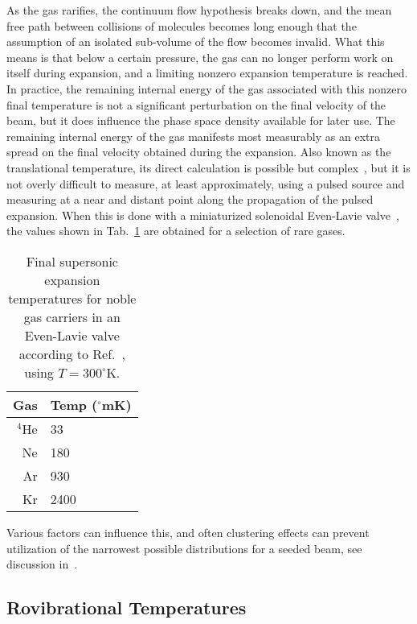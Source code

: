 As the gas rarifies, the continuum flow hypothesis breaks down, and the mean free path between collisions of molecules becomes long enough that the assumption of an isolated sub-volume of the flow becomes invalid.
What this means is that below a certain pressure, the gas can no longer perform work on itself during expansion, and a limiting nonzero expansion temperature is reached.
In practice, the remaining internal energy of the gas associated with this nonzero final temperature is not a significant perturbation on the final velocity of the beam, but it does influence the phase space density available for later use.
The remaining internal energy of the gas manifests most measurably as an extra spread on the final velocity obtained during the expansion.
Also known as the translational temperature, its direct calculation is possible but complex~\cite{Montero2017}, but it is not overly difficult to measure, at least approximately, using a pulsed source and measuring at a near and distant point along the propagation of the pulsed expansion.
When this is done with a miniaturized solenoidal Even-Lavie valve~\cite{Even2014}, the values shown in Tab.~\ref{tabtrans} are obtained for a selection of rare gases.
\begin{table}[t!]
\centering
\caption[Final Supersonic Expansion Temperatures]{Final supersonic expansion temperatures for noble gas carriers in an Even-Lavie valve according to Ref.~\citep[Fig.~12]{Even2014}, using $T=300^\circ$K.\label{tabtrans}}
\begin{tabular}{r|l}
Gas & Temp ($^\circ$mK)\\
\hline
$^4$He & 33 \\
Ne & 180 \\
Ar & 930 \\
Kr & 2400 \\
\end{tabular}
\end{table}
Various factors can influence this, and often clustering effects can prevent utilization of the narrowest possible distributions for a seeded beam, see discussion in~\citep[Page~47]{SawyerThesis2010}.

\subsection{Rovibrational Temperatures}

